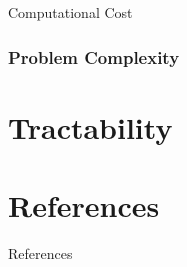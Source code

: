\documentclass[10pt,compress,xcolor={usenames,dvipsnames},aspectratio=169]{beamer}
\begin{document}
\begin{frame}{Computational Cost}
	
\end{frame}


\section{Problem Complexity}


\part{Tractability}


\part{References}
\begin{frame}{References}
	\printbibliography
\end{frame}
\end{document}

